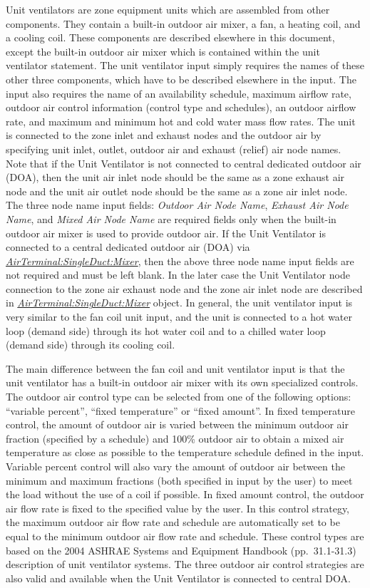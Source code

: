 Unit ventilators are zone equipment units which are assembled from other components. They contain a built-in outdoor air mixer, a fan, a heating coil, and a cooling coil. These components are described elsewhere in this document, except the built-in outdoor air mixer which is contained within the unit ventilator statement. The unit ventilator input simply requires the names of these other three components, which have to be described elsewhere in the input. The input also requires the name of an availability schedule, maximum airflow rate, outdoor air control information (control type and schedules), an outdoor airflow rate, and maximum and minimum hot and cold water mass flow rates. The unit is connected to the zone inlet and exhaust nodes and the outdoor air by specifying unit inlet, outlet, outdoor air and exhaust (relief) air node names. Note that if the Unit Ventilator is not connected to central dedicated outdoor air (DOA), then the unit air inlet node should be the same as a zone exhaust air node and the unit air outlet node should be the same as a zone air inlet node. The three node name input fields: \textit{Outdoor Air Node Name}, \textit{Exhaust Air Node Name}, and \textit{Mixed Air Node Name} are required fields only when the built-in outdoor air mixer is used to provide outdoor air. If the Unit Ventilator is connected to a central dedicated outdoor air (DOA) via \textit{\hyperref[airterminalsingleductmixer]{AirTerminal:SingleDuct:Mixer}}, then the above three node name input fields are not required and must be left blank. In the later case the Unit Ventilator node connection to the zone air exhaust node and the zone air inlet node are described in \textit{\hyperref[airterminalsingleductmixer]{AirTerminal:SingleDuct:Mixer}} object. In general, the unit ventilator input is very similar to the fan coil unit input, and the unit is connected to a hot water loop (demand side) through its hot water coil and to a chilled water loop (demand side) through its cooling coil.

The main difference between the fan coil and unit ventilator input is that the unit ventilator has a built-in outdoor air mixer with its own specialized controls. The outdoor air control type can be selected from one of the following options: ``variable percent'', ``fixed temperature'' or ``fixed amount''. In fixed temperature control, the amount of outdoor air is varied between the minimum outdoor air fraction (specified by a schedule) and 100\% outdoor air to obtain a mixed air temperature as close as possible to the temperature schedule defined in the input. Variable percent control will also vary the amount of outdoor air between the minimum and maximum fractions (both specified in input by the user) to meet the load without the use of a coil if possible. In fixed amount control, the outdoor air flow rate is fixed to the specified value by the user. In this control strategy, the maximum outdoor air flow rate and schedule are automatically set to be equal to the minimum outdoor air flow rate and schedule. These control types are based on the 2004 ASHRAE Systems and Equipment Handbook (pp.~31.1-31.3) description of unit ventilator systems. The three outdoor air control strategies are also valid and available when the Unit Ventilator is connected to central DOA.

